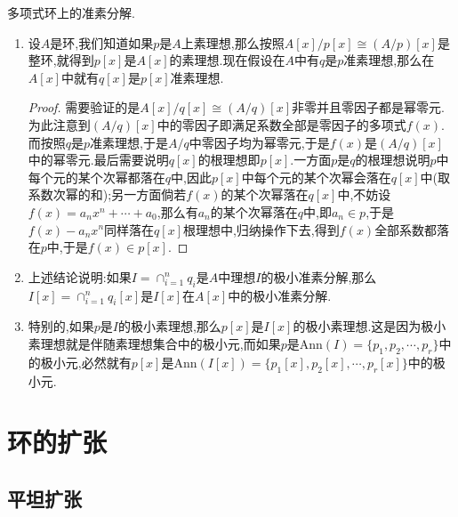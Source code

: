 多项式环上的准素分解.
\begin{enumerate}
	\item 设$A$是环,我们知道如果$p$是$A$上素理想,那么按照$A[x]/p[x]\cong(A/p)[x]$是整环,就得到$p[x]$是$A[x]$的素理想.现在假设在$A$中有$q$是$p$准素理想,那么在$A[x]$中就有$q[x]$是$p[x]$准素理想.
	\begin{proof}
		
		需要验证的是$A[x]/q[x]\cong(A/q)[x]$非零并且零因子都是幂零元.为此注意到$(A/q)[x]$中的零因子即满足系数全部是零因子的多项式$f(x)$.而按照$q$是$p$准素理想,于是$A/q$中零因子均为幂零元,于是$f(x)$是$(A/q)[x]$中的幂零元.最后需要说明$q[x]$的根理想即$p[x]$.一方面$p$是$q$的根理想说明$p$中每个元的某个次幂都落在$q$中,因此$p[x]$中每个元的某个次幂会落在$q[x]$中(取系数次幂的和);另一方面倘若$f(x)$的某个次幂落在$q[x]$中,不妨设$f(x)=a_nx^n+\cdots+a_0$,那么有$a_n$的某个次幂落在$q$中,即$a_n\in p$,于是$f(x)-a_nx^n$同样落在$q[x]$根理想中,归纳操作下去,得到$f(x)$全部系数都落在$p$中,于是$f(x)\in p[x]$.
	\end{proof}
	\item 上述结论说明:如果$I=\cap_{i=1}^nq_i$是$A$中理想$I$的极小准素分解,那么$I[x]=\cap_{i=1}^nq_i[x]$是$I[x]$在$A[x]$中的极小准素分解.
	\item 特别的,如果$p$是$I$的极小素理想,那么$p[x]$是$I[x]$的极小素理想.这是因为极小素理想就是伴随素理想集合中的极小元,而如果$p$是$\mathrm{Ann}(I)=\{p_1,p_2,\cdots,p_r\}$中的极小元,必然就有$p[x]$是$\mathrm{Ann}(I[x])=\{p_1[x],p_2[x],\cdots,p_r[x]\}$中的极小元.
\end{enumerate}
\newpage
\section{环的扩张}
\subsection{平坦扩张}

